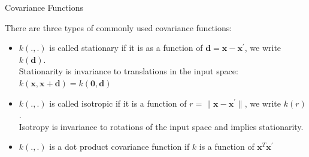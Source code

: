 





\begin{vbframe}{Covariance Functions}

There are three types of commonly used covariance functions:

\begin{itemize}

\item $k(.,.)$ is called stationary if it is as a function of $\bm{d} = \bm{x} - \bm{x}^\prime$, we write $k(\bm{d})$.\\
Stationarity is invariance to translations in the input space: $k(\bm{x},\bm{x} + \bm{d}) = k(\bm{0}, \bm{d})$
\item $k(.,.)$ is called isotropic if it is a function of $r = \|\bm{x} - \bm{x}^\prime\|$, we write $k(r)$.\\
Isotropy is invariance to rotations of the input space and implies stationarity. 
\item $k(., .)$ is a dot product covariance function if $k$ is a function of $\bm{x}^T \bm{x}^\prime$
\end{itemize}

\end{vbframe}


